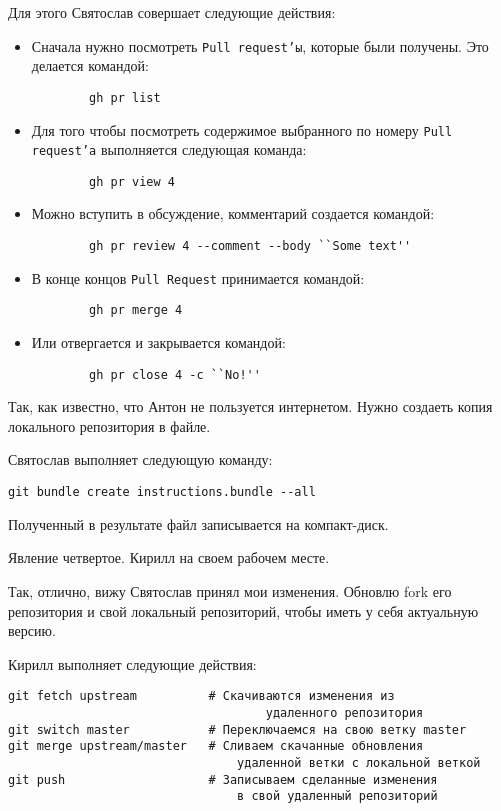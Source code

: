 \documentclass[14pt,a4paper]{article}
\begin{document}
Для этого Святослав совершает следующие действия:
\begin{itemize}
	\item Сначала нужно посмотреть \texttt{Pull request'ы}, которые были получены.
		Это делается командой:
		\begin{verbatim}
		gh pr list
		\end{verbatim}
	\item Для того чтобы посмотреть содержимое выбранного по номеру \texttt{Pull request'а}
		выполняется следующая команда:
		\begin{verbatim}
		gh pr view 4
		\end{verbatim}
	\item Можно вступить в обсуждение, комментарий создается командой:
		\begin{verbatim}
		gh pr review 4 --comment --body ``Some text''
		\end{verbatim}
	\item В конце концов \texttt{Pull Request} принимается командой:
		\begin{verbatim}
		gh pr merge 4 
		\end{verbatim}
	\item Или отвергается и закрывается командой:
		\begin{verbatim}
		gh pr close 4 -c ``No!''
		\end{verbatim}
\end{itemize}
Так, как известно, что Антон не пользуется интернетом. Нужно создаеть копия локального 
репозитория в файле. 

Святослав выполняет следующую команду:

\begin{verbatim}
git bundle create instructions.bundle --all
\end{verbatim}

Полученный в результате файл записывается на компакт-диск.

Явление четвертое.
Кирилл на своем рабочем месте. 

 Так, отлично, вижу Святослав принял мои изменения. Обновлю fork его 
репозитория и свой локальный репозиторий, чтобы иметь у себя актуальную версию.

Кирилл выполняет следующие действия:
\begin{verbatim}
git fetch upstream			# Скачиваются изменения из 
									удаленного репозитория
git switch master			# Переключаемся на свою ветку master
git merge upstream/master	# Сливаем скачанные обновления 
								удаленной ветки с локальной веткой
git push					# Записываем сделанные изменения
								в свой удаленный репозиторий
\end{verbatim}
\end{document}
